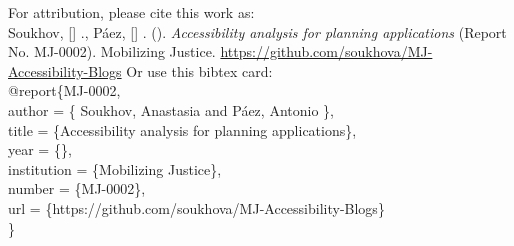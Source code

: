 \documentclass[12pt, oneside]{report}
\newcommand*{\ExtractFirstChar}[1]{%
        \StrChar{#1}{1}[\FirstChar]%
    \FirstChar
}
\begin{document}
  \vskip 20pt
  For attribution, please cite this work as:\\
  \vskip 1pt
            {Soukhov, \ExtractFirstChar{Anastasia}.,}
              {Páez, \ExtractFirstChar{Antonio}.}
   (\the\year). \textit{Accessibility analysis for planning
applications} (Report No. MJ-0002). Mobilizing Justice. \url{https://github.com/soukhova/MJ-Accessibility-Blogs}
  \vskip 20pt
  Or use this bibtex card:\\
  \vskip 1pt
  @report\{MJ-0002,\\
           \hspace*{1.6cm} author = \{                                                                                  {Soukhov, Anastasia and} 
                                                                                                                          {Páez, Antonio}
                                                                                \},\\
           \hspace*{1.6cm} title = \{Accessibility analysis for planning
applications\},\\
           \hspace*{1.6cm} year = \{\the\year\},\\
           \hspace*{1.6cm} institution = \{Mobilizing Justice\},\\
           \hspace*{1.6cm} number = \{MJ-0002\},\\
           \hspace*{1.6cm} url = \{https://github.com/soukhova/MJ-Accessibility-Blogs\}\\
  \}

\vspace*{\fill}
{}
\end{document}
